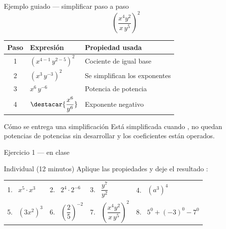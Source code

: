 \documentclass[aspectratio=169,10pt]{beamer}
\begin{document}
\begin{frame}{Ejemplo guiado — simplificar paso a paso}
  \scriptsize
  \[ \left(\frac{x^{4}y^{2}}{x\,y^{5}}\right)^{2} \]

  \vspace{0.05cm}
  \begin{center}
  \begin{tabular}{@{}clp{5.4cm}@{}}
    \toprule
    \textbf{Paso} & \textbf{Expresión} & \textbf{Propiedad usada} \\
    \midrule
    1 & $\left(x^{4-1}\,y^{2-5}\right)^{2}$ & Cociente de igual base \\
    2 & $\left(x^{3}\,y^{-3}\right)^{2}$ & Se simplifican los exponentes \\
    3 & $x^{6}\,y^{-6}$ & Potencia de potencia \\
    4 & $\destacar{\dfrac{x^{6}}{y^{6}}}$ & Exponente negativo \\
    \bottomrule
  \end{tabular}
  \end{center}

  \vspace{0.05cm}
  \begin{alertblock}{Cómo se entrega una simplificación}
    \tiny
    Está simplificada cuando , no
    quedan potencias de potencias sin desarrollar y los coeficientes están
    operados. 
  \end{alertblock}
\end{frame}

\begin{frame}{Ejercicio 1 — en clase}
  \begin{alertblock}{Individual (12 minutos)}
    \scriptsize
    Aplique las propiedades y deje el resultado :

    \vspace{0.25cm}
    \centering
    \begin{tabular}{@{}llll@{}}
      1. \ $x^{5}\cdot x^{3}$ &
      2. \ $2^{4}\cdot 2^{-6}$ &
      3. \ $\dfrac{y^{7}}{y^{2}}$ &
      4. \ $\left(a^{3}\right)^{4}$ \\[1.1em]
      5. \ $\left(3x^{2}\right)^{3}$ &
      6. \ $\left(\dfrac{2}{5}\right)^{-2}$ &
      7. \ $\left(\dfrac{x^{4}y^{2}}{x\,y^{5}}\right)^{2}$ &
      8. \ $5^{0} + (-3)^{0} - 7^{0}$ \\
    \end{tabular}
  \end{alertblock}
\end{frame}
\end{document}
